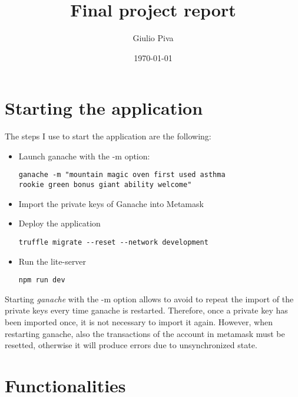 \documentclass[11pt]{article}
\title{Final project report}
\author{ Giulio Piva}
\date{\today}
\begin{document}
\maketitle	


\section{Starting the application}
The steps I use to start the application are the following:
\begin{itemize}
\item Launch ganache with the -m option:

\begin{lstlisting}[frame=single]
ganache -m "mountain magic oven first used asthma
rookie green bonus giant ability welcome"
\end{lstlisting}
\item Import the private keys of Ganache into Metamask
\item Deploy the application
\begin{lstlisting}[frame=single]
truffle migrate --reset --network development
\end{lstlisting}
\item Run the lite-server
\begin{lstlisting}[frame=single]
npm run dev
\end{lstlisting}
\end{itemize}
Starting \textit{ganache} with the -m option allows to avoid to repeat the import
of the private keys every time ganache is restarted.
Therefore, once a private key has been imported once, it is not necessary to import it again.
However, when restarting ganache, also the transactions of the account in metamask must be resetted,
otherwise it will produce errors due to unsynchronized state.

\section{Functionalities}
\end{document}
